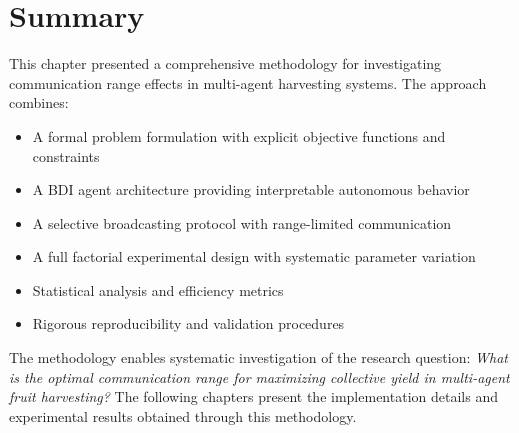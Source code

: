 \section{Summary}

This chapter presented a comprehensive methodology for investigating communication range effects in multi-agent harvesting systems. The approach combines:

\begin{itemize}
    \item A formal problem formulation with explicit objective functions and constraints
    \item A BDI agent architecture providing interpretable autonomous behavior
    \item A selective broadcasting protocol with range-limited communication
    \item A full factorial experimental design with systematic parameter variation
    \item Statistical analysis and efficiency metrics
    \item Rigorous reproducibility and validation procedures
\end{itemize}

The methodology enables systematic investigation of the research question: \emph{What is the optimal communication range for maximizing collective yield in multi-agent fruit harvesting?} The following chapters present the implementation details and experimental results obtained through this methodology.